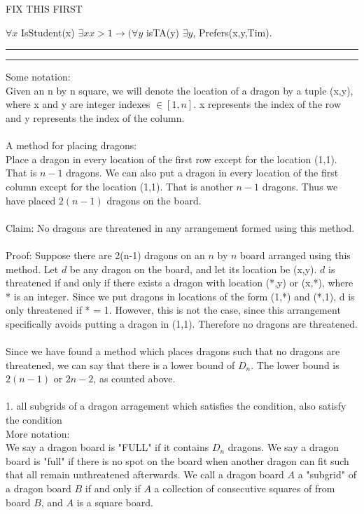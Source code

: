 \documentclass[11pt,letterpaper]{article}
\newcommand{\question}[2] {\vspace{.25in} \hrule\vspace{0.5em}
\noindent{\bf #1: #2} \vspace{0.5em}
\hrule \vspace{.10in}}
\begin{document}
FIX THIS FIRST

$\forall x$ IsStudent(x) $\exists x x>1 \rightarrow (\forall y$ isTA(y) $\exists y$, Prefers(x,y,Tim).

\question{3}{Dragon Chess}
Some notation:\\
Given an n by n square, we will denote the location of a dragon by a tuple (x,y), where x and y are integer indexes $\in [1,n]$. x represents the index of the row and y represents the index of the column.\\
\\
A method for placing dragons:\\
Place a dragon in every location of the first row except for the location (1,1). That is $n-1$ dragons. We can also put a dragon in every location of the first column except for the location (1,1). That is another $n-1$ dragons. Thus we have placed $2(n-1)$ dragons on the board.\\
\\
Claim: No dragons are threatened in any arrangement formed using this method.\\
\\
Proof: Suppose there are 2(n-1) dragons on an $n$ by $n$ board arranged using this method. Let $d$ be any dragon on the board, and let its location be (x,y). $d$ is threatened if and only if there exists a dragon with location (*,y) or (x,*), where * is an integer. Since we put dragons in locations of the form (1,*) and (*,1), d is only threatened if * = 1. However, this is not the case, since this arrangement specifically avoids putting a dragon in (1,1). Therefore no dragons are threatened.\\
\\
Since we have found a method which places dragons such that no dragons are threatened, we can say that there is a lower bound of $D_n$. The lower bound is $2(n-1)$ or $2n-2$, as counted above.\\
\\
1. all subgrids of a dragon arragement which satisfies the condition, also satisfy the condition\\
More notation: \\
We say a dragon board is "FULL" if it contains $D_n$ dragons. We say a dragon board is "full" if there is no spot on the board when another dragon can fit such that all remain unthreatened afterwards. We call a dragon board $A$ a "subgrid" of a dragon board $B$ if and only if $A$ a collection of consecutive squares of from board $B$, and $A$ is a square board.\\
\\
\end{document}
